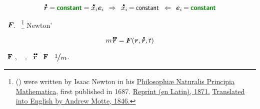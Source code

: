 \nopagebreak\vspace{-0.8em}
\begin{equation*}
\mathdotabove{\locationvector} = \hspace{-0.1ex} \boldconstant = \mathdotabove{x}_i \hspace{.1ex} \bm{e}_i
\hspace{.4em} \Rightarrow \hspace{.5em}
\mathdotabove{x}_i \hspace{-0.2ex} = \hspace{-0.1ex} \constant
\hspace{.5em} \Leftarrow \hspace{.4em}
\bm{e}_i \hspace{-0.2ex} = \hspace{-0.1ex} \boldconstant
\end{equation*}

\vspace{-0.5em}
\ru{\:---}
~${\bm{F}\hspace{-0.2ex}}$.
~\footnote{%
 ()
were written by Isaac Newton in his \href{http://www.gutenberg.org/files/28233/28233-pdf.pdf}{Philosophiæ Naturalis Principia Mathematica}, first published in 1687.
\href{https://archive.org/details/principia00newtuoft/page/n11/mode/2up}{Reprint (en Latin), 1871.}
\href{https://archive.org/details/newtonspmathema00newtrich/page/n7/mode/2up}{Translated into English by Andrew Motte, 1846.}
}\hbox{\hspace{-0.2ex}}
Newton’

\nopagebreak\vspace{-0.4em}
\begin{equation}\label{law:ofnewton}
m \hspace{.2ex} \mathdotdotabove{\locationvector} \hspace{.1ex} = \hspace{-0.1ex} \bm{F} ( \locationvector, \mathdotabove{\locationvector}, t )
\end{equation}

\vspace{-0.5em}\noindent
{}~$\bm{F}$
,
~
,
~$\mathdotdotabove{\locationvector}$
\href{https://www.mathsisfun.com/algebra/directly-inversely-proportional.html}{}
~$\bm{F}$
~${\raisemath{-0.1em}{\scalebox{1.2}{$\nicefrac{1}{m}$}}\hspace{.1ex}}$.

